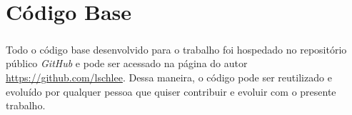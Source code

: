 \documentclass[grad,numbers]{coppe}
\begin{document}
    \chapter{Código Base}
        \paragraph{}Todo o código base desenvolvido para o trabalho foi hospedado no repositório público \textit{GitHub} e pode ser acessado na página do autor \url{https://github.com/lschlee}. Dessa maneira, o código pode ser reutilizado e evoluído por qualquer pessoa que quiser contribuir e evoluir com o presente trabalho. 
        
\end{document}
